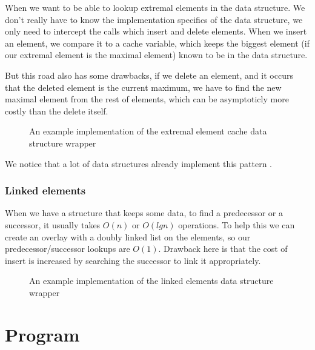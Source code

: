\documentclass[a4paper,11pt]{article}
\begin{document}
			When we want to be able to lookup extremal elements in the data structure. We don't really have
			to know the implementation specifics of the data structure, we only need to intercept the calls
			which insert and delete elements. When we insert an element, we compare it to a cache variable,
			which keeps the biggest element (if our extremal element is the maximal element) known to be in
			the data structure.

			But this road also has some drawbacks, if we delete an element, and it occurs that the deleted
			element is the current maximum, we have to find the new maximal element from the rest of
			elements, which can be asymptoticly more costly than the delete itself.


			\begin{figure}
				

				\caption{An example implementation of the extremal element cache data structure wrapper}

				\label{fig:elem-cache}
			\end{figure}

			We notice that a lot of data structures already implement this pattern \cite{Wiveb}.

        \subsubsection{Linked elements}\label{sec:gdsm:le}

			When we have a structure that keeps some data, to find a predecessor or a successor, it usually
			takes $O(n)$ or $O(lg n)$ operations.  To help this we can create an overlay with a doubly
			linked list on the elements, so our predecessor/successor lookups are $O(1)$. Drawback here is
			that the cost of insert is increased by searching the successor to link it appropriately.

			\begin{figure}
				

				\caption{An example implementation of the linked elements data structure wrapper}

				\label{fig:linked-cache}
			\end{figure}

\section{Program}
\end{document}
